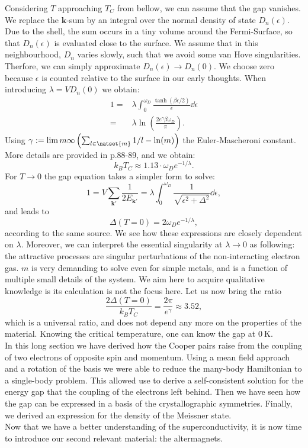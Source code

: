 \documentclass[../main.tex]{subfile}
\begin{document}
Considering $T$ approaching $T_C$ from bellow, we can assume that the gap vanishes. We replace the $\bm{k}$-sum by an integral over the normal 
density of state $D_n(\epsilon)$. Due to the shell, the sum occurs in a tiny volume around the Fermi-Surface, so that $D_n(\epsilon)$ is 
evaluated close to the surface. We assume that in this neighbourhood, $D_n$ varies slowly, such that we avoid some van Hove singularities. Therfore, we can 
simply approximate $D_n(\epsilon) \rightarrow D_n(0)$. We choose zero because $\epsilon$ is counted relative to the surface in our early thoughts. 
When introducing $\lambda = V D_n(0)$ we obtain:
\begin{equation*}
    \begin{aligned}
        1 =& \lambda \int_0^{\omega_D} \frac{\tanh\left(\beta\epsilon/2\right)}{\epsilon} \dd \epsilon\\
        =& \lambda \ln\left(\frac{2e^{\gamma}\beta \omega_D}{\pi}\right).
    \end{aligned}
\end{equation*}
Using $\gamma := \lim{m}{\infty} \left(\sum_{l\in\natset{m}} 1/l - \ln(m)\right)$ the Euler-Mascheroni constant. More details are provided
in \cite{FossheimSudbo2004} p.88-89, and we obtain:
\[
    k_B T_C \approx 1.13\cdot  \omega_D e^{-1/\lambda}.
\]
For $T\rightarrow 0$ the gap equation takes a simpler form to solve:
\begin{equation*}
        1 = V \sum_{\bm{k}'} \frac{1}{2 E_{\bm{k}'}} = \lambda\int_0^{\omega_D}  \frac{1}{\sqrt{\epsilon^2 + \Delta^2}}\dd \epsilon,
\end{equation*}
and leads to 
\[
    \Delta(T=0) = 2 \omega_D e^{-1/\lambda},
\]
according to the same source. We see how these expressions are closely dependent on $\lambda$. Moreover, we can interpret the essential singularity
at $\lambda\rightarrow 0$ as following: the attractive processes are singular perturbations of the non-interacting electron gas.
$m$ is very demanding to solve even for simple metals, and is a function of multiple small details of the system. We aim here 
to acquire qualitative knowledge is its calculation is not the focus here. Let us now bring the ratio
\[
    \frac{2\Delta(T=0)}{k_B T_C} = \frac{2 \pi}{e^{\gamma}} \approx 3.52,
\]  
which is a universal ratio, and does not depend any more on the properties of the material. Knowing the critical temperature, one can know
the gap at $\SI{0}{\kelvin}$.\\

In this long section we have derived how the Cooper pairs raise from the coupling of two electrons of opposite spin and momentum. Using a mean field approach
and a rotation of the basis we were able to reduce the many-body Hamiltonian to a single-body problem. This allowed use to derive a self-consistent solution for 
the energy gap that the coupling of the electrons left behind. Then we have seen how the gap can be expressed in a basis of the crystallographic symmetries.
Finally, we derived an expression for the density of the Meissner state.\\

Now that we have a better understanding of the superconductivity, it is now time to introduce our second relevant material: the altermagnets.
\end{document}
